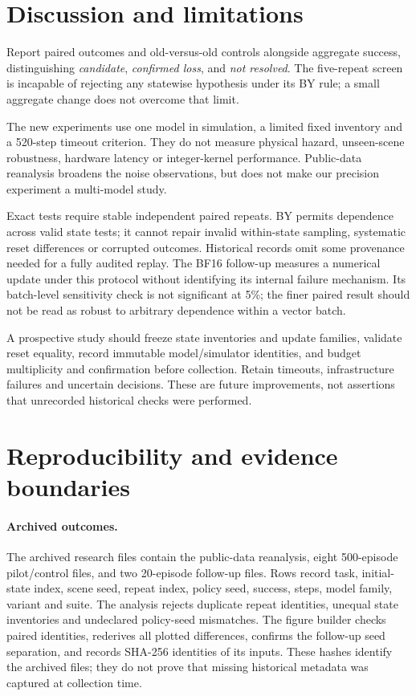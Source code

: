\documentclass{article}
\begin{document}
\section{Discussion and limitations}
Report paired outcomes and old-versus-old controls alongside aggregate success,
distinguishing \emph{candidate}, \emph{confirmed loss}, and \emph{not resolved}.
The five-repeat screen is incapable of rejecting any statewise hypothesis under
its BY rule; a small aggregate change does not overcome that limit.

The new experiments use one model in simulation, a limited fixed inventory and
a 520-step timeout criterion. They do not measure physical hazard, unseen-scene
robustness, hardware latency or integer-kernel performance. Public-data reanalysis
broadens the noise observations, but does not make our precision experiment
a multi-model study.

Exact tests require stable independent paired repeats. BY permits dependence across
valid state tests; it cannot repair invalid within-state sampling, systematic
reset differences or corrupted outcomes. Historical records omit some provenance
needed for a fully audited replay. The BF16 follow-up measures a numerical update
under this protocol without identifying its internal failure mechanism. Its
batch-level sensitivity check is not significant at 5\%; the finer paired result
should not be read as robust to arbitrary dependence within a vector batch.

A prospective study should freeze state inventories and update families, validate
reset equality, record immutable model/simulator identities, and budget multiplicity
and confirmation before collection. Retain timeouts, infrastructure failures and
uncertain decisions. These are future improvements, not assertions that unrecorded
historical checks were performed.

\clearpage
{
\small

}
\clearpage
\appendix
\section{Reproducibility and evidence boundaries}
\label{app:reproducibility}
\paragraph{Archived outcomes.}
The archived research files contain the public-data reanalysis,
eight 500-episode pilot/control files, and two 20-episode follow-up files.
Rows record task, initial-state index, scene seed, repeat index, policy seed,
success, steps, model family, variant and suite. The analysis rejects duplicate
repeat identities, unequal state inventories and undeclared policy-seed mismatches.
The figure builder checks paired identities, rederives all plotted differences,
confirms the follow-up seed separation, and records SHA-256 identities of its inputs.
These hashes identify the archived files; they do not prove that missing historical
metadata was captured at collection time.
\end{document}
